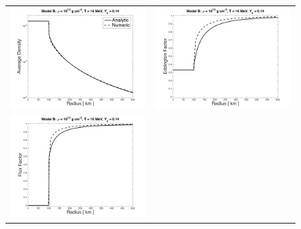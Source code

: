\documentclass[11pt,letterpaper,twoside,english,final]{article}
\begin{document}
\begin{figure}[h]
  \centering
  \begin{tabular}{cc}
    \includegraphics[scale=0.4]{./Figures/HomogeneousSphereTable_B_Density} &
    \includegraphics[scale=0.4]{./Figures/HomogeneousSphereTable_B_EddingtonFactor} \\
    \includegraphics[scale=0.4]{./Figures/HomogeneousSphereTable_B_FluxFactor} &

\end{tabular}
\end{figure}
\end{document}
